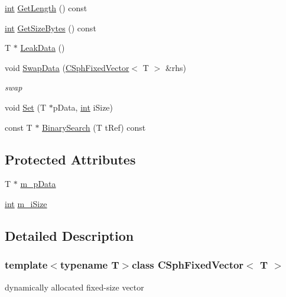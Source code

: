 \begin{DoxyCompactItemize}
\hyperlink{sphinxexpr_8cpp_a4a26e8f9cb8b736e0c4cbf4d16de985e}{int} \hyperlink{classCSphFixedVector_a55a4c6944b335bb03b1b4c47cbc762eb}{Get\-Length} () const 
\item 
\hyperlink{sphinxexpr_8cpp_a4a26e8f9cb8b736e0c4cbf4d16de985e}{int} \hyperlink{classCSphFixedVector_a55d9a00526f9c16e8f291c5d35b8df18}{Get\-Size\-Bytes} () const 
\item 
T $\ast$ \hyperlink{classCSphFixedVector_a98c0b15221862ef78b88d803989bf316}{Leak\-Data} ()
\item 
void \hyperlink{classCSphFixedVector_a330c4f18f82b455ccc88689531762bb4}{Swap\-Data} (\hyperlink{classCSphFixedVector}{C\-Sph\-Fixed\-Vector}$<$ T $>$ \&rhs)
\begin{DoxyCompactList}\small\item\em swap \end{DoxyCompactList}\item 
void \hyperlink{classCSphFixedVector_a9e369f456d4352bc65bd0c558ae89754}{Set} (T $\ast$p\-Data, \hyperlink{sphinxexpr_8cpp_a4a26e8f9cb8b736e0c4cbf4d16de985e}{int} i\-Size)
\item 
const T $\ast$ \hyperlink{classCSphFixedVector_a68256dc9b2d0404c5bf5075ded324105}{Binary\-Search} (T t\-Ref) const 
\end{DoxyCompactItemize}
\subsection*{Protected Attributes}
\begin{DoxyCompactItemize}
\item 
T $\ast$ \hyperlink{classCSphFixedVector_a672980c14ae13d3bc1045c4f51f179c6}{m\-\_\-p\-Data}
\item 
\hyperlink{sphinxexpr_8cpp_a4a26e8f9cb8b736e0c4cbf4d16de985e}{int} \hyperlink{classCSphFixedVector_aeb1180497024693b2160fbac1f80b941}{m\-\_\-i\-Size}
\end{DoxyCompactItemize}


\subsection{Detailed Description}
\subsubsection*{template$<$typename T$>$class C\-Sph\-Fixed\-Vector$<$ T $>$}

dynamically allocated fixed-\/size vector 

